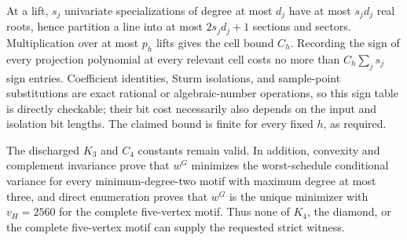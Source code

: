 At a lift, \(s_j\) univariate specializations of degree at most \(d_j\) have at most \(s_jd_j\) real roots, hence partition a line into at most \(2s_jd_j+1\) sections and sectors.  Multiplication over at most \(p_h\) lifts gives the cell bound \(C_h\).  Recording the sign of every projection polynomial at every relevant cell costs no more than \(C_h\sum_j s_j\) sign entries.  Coefficient identities, Sturm isolations, and sample-point substitutions are exact rational or algebraic-number operations, so this sign table is directly checkable; their bit cost necessarily also depends on the input and isolation bit lengths.  The claimed bound is finite for every fixed \(h\), as required.

The discharged \(K_3\) and \(C_4\) constants remain valid.  In addition, convexity and complement invariance prove that \(w^G\) minimizes the worst-schedule conditional variance for every minimum-degree-two motif with maximum degree at most three, and direct enumeration proves that \(w^G\) is the unique minimizer with \(v_H=2560\) for the complete five-vertex motif.  Thus none of \(K_4\), the diamond, or the complete five-vertex motif can supply the requested strict witness.
